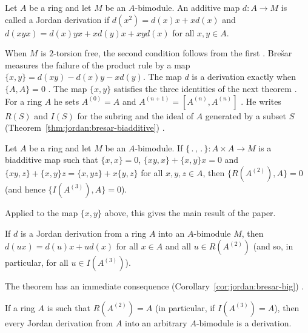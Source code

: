 \begin{definition}\label{def:jordan:bresar-2005}
Let $A$ be a ring and let $M$ be an $A$-bimodule. An additive map $d\colon A\to M$ is called a
Jordan derivation if $d(x^{2})=d(x)x+xd(x)$ and $d(xyx)=d(x)yx+xd(y)x+xyd(x)$ for all
$x,y\in A$.
\end{definition}

When $M$ is $2$-torsion free, the second condition follows from the first
\cite[p.~414]{Bresar2005}. Brešar measures the failure of the product rule by
a map $\{x,y\}=d(xy)-d(x)y-xd(y)$. The map $d$ is a derivation exactly when
$\{A,A\}=0$ \cite[p.~414]{Bresar2005}. The map $\{x,y\}$ satisfies the three
identities of the next theorem \cite[p.~414]{Bresar2005}. For a ring $A$ he
sets $A^{(0)}=A$ and $A^{(n+1)}=[A^{(n)},A^{(n)}]$ \cite[p.~412]{Bresar2005}.
He writes $R(S)$ and $I(S)$ for the subring and the ideal of $A$ generated by
a subset $S$ (Theorem~\ref{thm:jordan:bresar-biadditive})
\cite[p.~412]{Bresar2005}.

\begin{theorem}\label{thm:jordan:bresar-biadditive}
Let $A$ be a ring and let $M$ be an $A$-bimodule. If $\{\,.\,,\,.\,\}\colon A\times A\to M$
is a biadditive map such that $\{x,x\}=0$, $\{xy,x\}+\{x,y\}x=0$ and
$\{xy,z\}+\{x,y\}z=\{x,yz\}+x\{y,z\}$ for all $x,y,z\in A$, then
$\{R(A^{(2)}),A\}=0$ (and hence $\{I(A^{(3)}),A\}=0$).
\end{theorem}

Applied to the map $\{x,y\}$ above, this gives the main result of the paper.

\begin{theorem}\label{thm:jordan:bresar-restriction}
If $d$ is a Jordan derivation from a ring $A$ into an $A$-bimodule $M$, then
$d(ux)=d(u)x+ud(x)$ for all $x\in A$ and all $u\in R(A^{(2)})$ (and so, in particular,
for all $u\in I(A^{(3)})$).
\end{theorem}

The theorem has an immediate consequence
(Corollary~\ref{cor:jordan:bresar-big}) \cite[p.~414]{Bresar2005}.

\begin{corollary}\label{cor:jordan:bresar-big}
If a ring $A$ is such that $R(A^{(2)})=A$ (in particular, if $I(A^{(3)})=A$), then every
Jordan derivation from $A$ into an arbitrary $A$-bimodule is a derivation.
\end{corollary}

